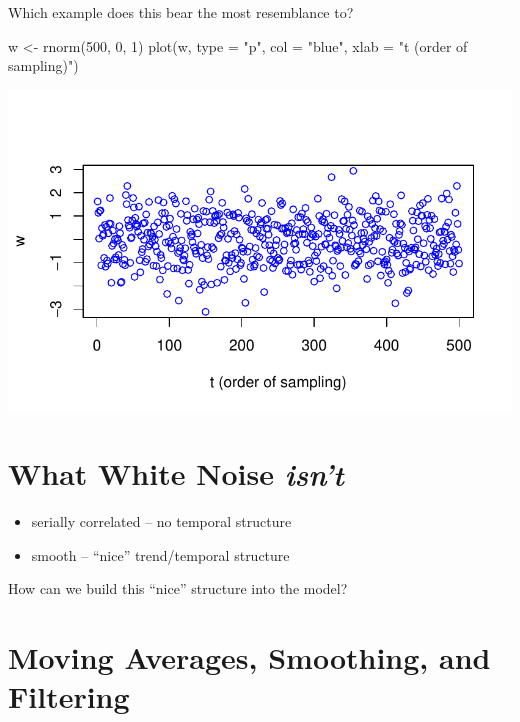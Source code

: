 \documentclass[
  letterpaper,
  DIV=11,
  numbers=noendperiod]{scrreprt}
\newenvironment{Shaded}{\begin{snugshade}}{\end{snugshade}}
\newcommand{\AttributeTok}[1]{\textcolor[rgb]{0.40,0.45,0.13}{#1}}
\newcommand{\DecValTok}[1]{\textcolor[rgb]{0.68,0.00,0.00}{#1}}
\newcommand{\FunctionTok}[1]{\textcolor[rgb]{0.28,0.35,0.67}{#1}}
\newcommand{\NormalTok}[1]{\textcolor[rgb]{0.00,0.23,0.31}{#1}}
\newcommand{\OtherTok}[1]{\textcolor[rgb]{0.00,0.23,0.31}{#1}}
\newcommand{\StringTok}[1]{\textcolor[rgb]{0.13,0.47,0.30}{#1}}
\begin{document}
Which example does this bear the most resemblance to?

\begin{Shaded}
\begin{Highlighting}[]
\NormalTok{w }\OtherTok{\textless{}{-}} \FunctionTok{rnorm}\NormalTok{(}\DecValTok{500}\NormalTok{, }\DecValTok{0}\NormalTok{, }\DecValTok{1}\NormalTok{)}
\FunctionTok{plot}\NormalTok{(w, }\AttributeTok{type =} \StringTok{"p"}\NormalTok{, }\AttributeTok{col =} \StringTok{"blue"}\NormalTok{, }\AttributeTok{xlab =} \StringTok{"t (order of sampling)"}\NormalTok{)}
\end{Highlighting}
\end{Shaded}

\includegraphics{LectureNotes/Lecture1_files/figure-pdf/white-noise-1.pdf}

\section{\texorpdfstring{What White Noise
\emph{isn't}}{What White Noise isn't}}\label{what-white-noise-isnt}

\begin{itemize}
\item
  serially correlated -- no temporal structure
\item
  smooth -- ``nice'' trend/temporal structure
\end{itemize}

How can we build this ``nice'' structure into the model?

\section{\texorpdfstring{{Moving Averages, Smoothing, and
Filtering}}{Moving Averages, Smoothing, and Filtering}}\label{moving-averages-smoothing-and-filtering}
\end{document}
